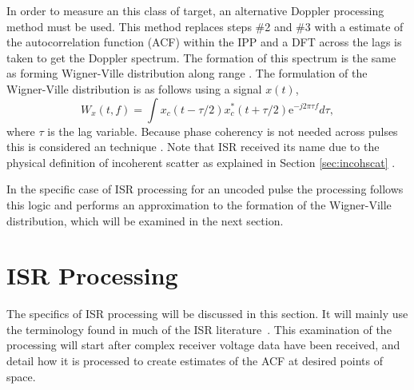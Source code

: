 In order to measure an this class of target, an alternative Doppler processing method must be used. This method replaces steps \#2 and \#3 with a estimate of the autocorrelation function (ACF) within the IPP and a DFT across the lags is taken to get the Doppler spectrum.
The formation of this spectrum is the same as forming Wigner-Ville distribution along range \cite{TFAcohen}. The formulation of the Wigner-Ville distribution is as follows using a signal $x(t)$,
\begin{equation}
\label{eqn:wigdist}
W_x(t,f)=\int x_c(t-\tau/2)x_c^*(t+\tau/2)\text{e}^{-j2\pi \tau f}d\tau,
\end{equation}
where $\tau$ is the lag variable. Because phase coherency is not needed across pulses this is considered an  technique \cite{richards2014fundamentals,richards2010principles,richards2014principles,skolnik2008radar}. 
Note that ISR received its name due to the physical definition of incoherent scatter as explained in Section \ref{sec:incohscat} \cite{gordon58,dougherty:farley1960}.


In the specific case of ISR processing for an uncoded pulse the processing follows this logic and performs an approximation to the formation of the Wigner-Ville distribution, which will be examined in the next section. 


\section{ISR Processing}\label{section:isrproc}
The specifics of ISR processing will be discussed in this section. It will mainly use the terminology found in much of the ISR literature~\cite{farley1969,nygren1996}. This examination of the processing will start after complex receiver voltage data have been received, and detail how it is processed to create estimates of the ACF at desired points of space.

